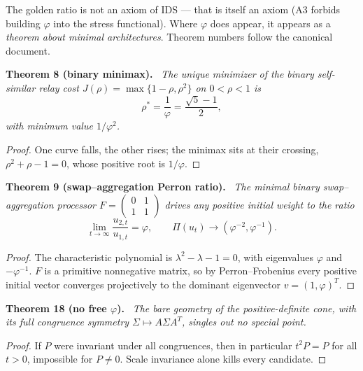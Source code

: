 \documentclass[11pt,a4paper]{article}
\newenvironment{namedthm}[1]{\par\addvspace{\medskipamount}\noindent\textbf{#1.}\ \itshape\ignorespaces}{\par\addvspace{\medskipamount}}
\theoremstyle{plain}
\begin{document}
The golden ratio is not an axiom of IDS --- that is itself an axiom (A3 forbids building $\varphi$ into the stress functional). Where $\varphi$ does appear, it appears as a \emph{theorem about minimal architectures}. Theorem numbers follow the canonical document.

\begin{namedthm}{Theorem 8 (binary minimax)}
The unique minimizer of the binary self-similar relay cost $J(\rho)=\max\{1-\rho,\rho^2\}$ on $0<\rho<1$ is
\begin{equation*}
\rho^\ast=\frac1\varphi=\frac{\sqrt5-1}{2},
\end{equation*}
with minimum value $1/\varphi^2$.
\end{namedthm}

\begin{proof}
One curve falls, the other rises; the minimax sits at their crossing, $\rho^2+\rho-1=0$, whose positive root is $1/\varphi$.
\end{proof}

\begin{namedthm}{Theorem 9 (swap--aggregation Perron ratio)}
The minimal binary swap--aggregation processor $F=\left(\begin{smallmatrix}0&1\\1&1\end{smallmatrix}\right)$ drives any positive initial weight to the ratio
\begin{equation*}
\lim_{t\to\infty}\frac{u_{2,t}}{u_{1,t}}=\varphi,
\qquad
\Pi(u_t)\to(\varphi^{-2},\varphi^{-1}).
\end{equation*}
\end{namedthm}

\begin{proof}
The characteristic polynomial is $\lambda^2-\lambda-1=0$, with eigenvalues $\varphi$ and $-\varphi^{-1}$. $F$ is a primitive nonnegative matrix, so by Perron--Frobenius every positive initial vector converges projectively to the dominant eigenvector $v=(1,\varphi)^T$.
\end{proof}

\begin{namedthm}{Theorem 18 (no free $\varphi$)}
The bare geometry of the positive-definite cone, with its full congruence symmetry $\Sigma\mapsto A\Sigma A^T$, singles out no special point.
\end{namedthm}

\begin{proof}
If $P$ were invariant under all congruences, then in particular $t^2P=P$ for all $t>0$, impossible for $P\ne0$. Scale invariance alone kills every candidate.
\end{proof}
\end{document}
